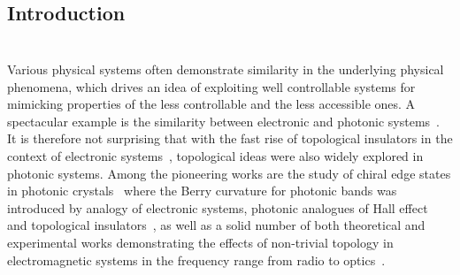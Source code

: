 \documentclass[
aps,
prl,
groupedaddress,
superscriptaddress,
floatfix,
notitlepage
]{revtex4-1}
\begin{document}

{\let\newpage\relax\maketitle}

\section{Introduction}
\chapter{}

Various physical systems often demonstrate similarity in the underlying physical phenomena, which drives an idea of exploiting well controllable systems for mimicking properties of the less controllable and the less accessible ones.
A spectacular example is the similarity between electronic and photonic systems~\cite{Georgescu2014}. 
It is therefore not surprising that with the fast rise of topological insulators in the context of electronic systems~\cite{Kane-Mele,Bernevig,Konig}, topological ideas were 
also widely explored in photonic systems. Among the pioneering works are the  
study of chiral edge states in photonic crystals~\cite{Raghu-2008} where the Berry curvature for photonic bands was introduced by analogy of electronic systems, photonic analogues of Hall effect~\cite{Haldane2008a, Wang2008,Wang-2009} and topological insulators~\cite{Hafezi-2011,Fang-2012,Rechtsman-2013,Khanikaev2013}, as well as a solid number of both theoretical and experimental works demonstrating the effects of non-trivial topology in electromagnetic systems in the frequency range from radio to optics~\cite{Lu-2014}. 
\end{document}
